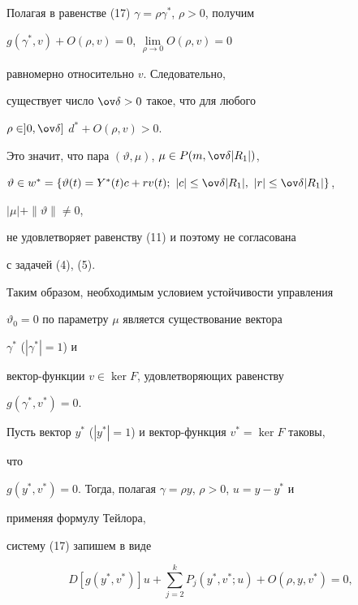  


\begin{pf} 


Полагая в равенстве (17) $\gamma=\rho\gamma^*$, $\rho>0$, получим 


$g(\gamma^*,v)+O(\rho,v)=0$, $\lim\limits_{\rho\to0}O(\rho,v)=0$ 


равномерно относительно $v$. Следовательно, 


существует число $\ov\delta>0$ такое, что для любого 


$\rho\in]0,\ov\delta]$\; $d^*+O(\rho,v)>0$. 


Это значит, что пара $(\vartheta,\mu)$, $\mu\in P(m,\ov\delta|R_1|)$, 


$\vartheta\in w^*=\{\vartheta(t)=Y^*(t)c+r v(t);\ 


|c|\le\ov\delta|R_1|,\ |r|\le\ov\delta|R_1|\}$, 


$|\mu|+\|\vartheta\|\ne0$, 


не удовлетворяет равенству (11) и поэтому не согласована 


с задачей (4), (5). 


\end{pf} 


 


Таким образом, необходимым условием устойчивости управления 


$\vartheta_0=0$ по параметру $\mu$ является существование вектора 


$\gamma^*$ ($|\gamma^*|=1$) и 


вектор-функции $v\in\ker F$, удовлетворяющих равенству 


$g(\gamma^*,v^*)=0$. 


 


Пусть вектор $y^*$ ($|y^*|=1$) и вектор-функция $v^*=\ker F$ таковы, 


что 


$g(y^*,v^*)=0$. Тогда, полагая $\gamma=\rho y$, $\rho>0$, $u=y-y^*$ и 


применяя формулу Тейлора, 


систему (17) запишем в виде 


\begin{equation} 


D[g(y^*,v^*)]u+\sum^k_{j=2}P_j(y^*,v^*;u)+ 


O(\rho,y,v^*)=0, 


\end{equation} 


